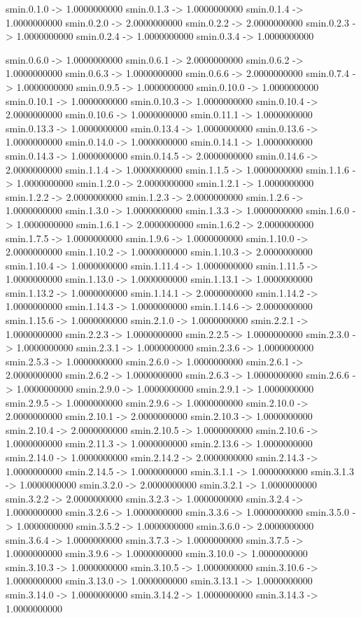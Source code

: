 smin.0.1.0 -> 1.0000000000    smin.0.1.3 -> 1.0000000000    smin.0.1.4 -> 1.0000000000    smin.0.2.0 -> 2.0000000000    smin.0.2.2 -> 2.0000000000    smin.0.2.3 -> 1.0000000000    smin.0.2.4 -> 1.0000000000    smin.0.3.4 -> 1.0000000000    



smin.0.6.0 -> 1.0000000000    smin.0.6.1 -> 2.0000000000    smin.0.6.2 -> 1.0000000000    smin.0.6.3 -> 1.0000000000    smin.0.6.6 -> 2.0000000000    smin.0.7.4 -> 1.0000000000    smin.0.9.5 -> 1.0000000000    smin.0.10.0 -> 1.0000000000    smin.0.10.1 -> 1.0000000000    smin.0.10.3 -> 1.0000000000    smin.0.10.4 -> 2.0000000000    smin.0.10.6 -> 1.0000000000    smin.0.11.1 -> 1.0000000000    smin.0.13.3 -> 1.0000000000    smin.0.13.4 -> 1.0000000000    smin.0.13.6 -> 1.0000000000    smin.0.14.0 -> 1.0000000000    smin.0.14.1 -> 1.0000000000    smin.0.14.3 -> 1.0000000000    smin.0.14.5 -> 2.0000000000    smin.0.14.6 -> 2.0000000000    smin.1.1.4 -> 1.0000000000    smin.1.1.5 -> 1.0000000000    smin.1.1.6 -> 1.0000000000    smin.1.2.0 -> 2.0000000000    smin.1.2.1 -> 1.0000000000    smin.1.2.2 -> 2.0000000000    smin.1.2.3 -> 2.0000000000    smin.1.2.6 -> 1.0000000000    smin.1.3.0 -> 1.0000000000    smin.1.3.3 -> 1.0000000000    smin.1.6.0 -> 1.0000000000    smin.1.6.1 -> 2.0000000000    smin.1.6.2 -> 2.0000000000    smin.1.7.5 -> 1.0000000000    smin.1.9.6 -> 1.0000000000    smin.1.10.0 -> 2.0000000000    smin.1.10.2 -> 1.0000000000    smin.1.10.3 -> 2.0000000000    smin.1.10.4 -> 1.0000000000    smin.1.11.4 -> 1.0000000000    smin.1.11.5 -> 1.0000000000    smin.1.13.0 -> 1.0000000000    smin.1.13.1 -> 1.0000000000    smin.1.13.2 -> 1.0000000000    smin.1.14.1 -> 2.0000000000    smin.1.14.2 -> 1.0000000000    smin.1.14.3 -> 1.0000000000    smin.1.14.6 -> 2.0000000000    smin.1.15.6 -> 1.0000000000    smin.2.1.0 -> 1.0000000000    smin.2.2.1 -> 1.0000000000    smin.2.2.3 -> 1.0000000000    smin.2.2.5 -> 1.0000000000    smin.2.3.0 -> 1.0000000000    smin.2.3.1 -> 1.0000000000    smin.2.3.6 -> 1.0000000000    smin.2.5.3 -> 1.0000000000    smin.2.6.0 -> 1.0000000000    smin.2.6.1 -> 2.0000000000    smin.2.6.2 -> 1.0000000000    smin.2.6.3 -> 1.0000000000    smin.2.6.6 -> 1.0000000000    smin.2.9.0 -> 1.0000000000    smin.2.9.1 -> 1.0000000000    smin.2.9.5 -> 1.0000000000    smin.2.9.6 -> 1.0000000000    smin.2.10.0 -> 2.0000000000    smin.2.10.1 -> 2.0000000000    smin.2.10.3 -> 1.0000000000    smin.2.10.4 -> 2.0000000000    smin.2.10.5 -> 1.0000000000    smin.2.10.6 -> 1.0000000000    smin.2.11.3 -> 1.0000000000    smin.2.13.6 -> 1.0000000000    smin.2.14.0 -> 1.0000000000    smin.2.14.2 -> 2.0000000000    smin.2.14.3 -> 1.0000000000    smin.2.14.5 -> 1.0000000000    smin.3.1.1 -> 1.0000000000    smin.3.1.3 -> 1.0000000000    smin.3.2.0 -> 2.0000000000    smin.3.2.1 -> 1.0000000000    smin.3.2.2 -> 2.0000000000    smin.3.2.3 -> 1.0000000000    smin.3.2.4 -> 1.0000000000    smin.3.2.6 -> 1.0000000000    smin.3.3.6 -> 1.0000000000    smin.3.5.0 -> 1.0000000000    smin.3.5.2 -> 1.0000000000    smin.3.6.0 -> 2.0000000000    smin.3.6.4 -> 1.0000000000    smin.3.7.3 -> 1.0000000000    smin.3.7.5 -> 1.0000000000    smin.3.9.6 -> 1.0000000000    smin.3.10.0 -> 1.0000000000    smin.3.10.3 -> 1.0000000000    smin.3.10.5 -> 1.0000000000    smin.3.10.6 -> 1.0000000000    smin.3.13.0 -> 1.0000000000    smin.3.13.1 -> 1.0000000000    smin.3.14.0 -> 1.0000000000    smin.3.14.2 -> 1.0000000000    smin.3.14.3 -> 1.0000000000 